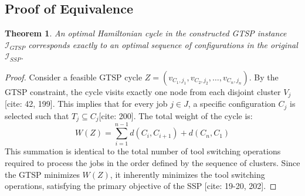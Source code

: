 \documentclass[12pt]{article}
\newtheorem{theorem}{Theorem}[section]
\begin{document}
\subsection{Proof of Equivalence}
\begin{theorem}
An optimal Hamiltonian cycle in the constructed GTSP instance $\mathcal{I}_{GTSP}$ corresponds exactly to an optimal sequence of configurations in the original $\mathcal{I}_{SSP}$.
\end{theorem}

\begin{proof}
Consider a feasible GTSP cycle $Z = (v_{C_1, j_1}, v_{C_2, j_2}, \dots, v_{C_n, j_n})$. By the GTSP constraint, the cycle visits exactly one node from each disjoint cluster $V_j$[cite: 42, 199]. This implies that for every job $j \in J$, a specific configuration $C_j$ is selected such that $T_j \subseteq C_j$[cite: 200]. 
The total weight of the cycle is:
\begin{equation}
    W(Z) = \sum_{i=1}^{n-1} d(C_i, C_{i+1}) + d(C_n, C_1)
\end{equation}
This summation is identical to the total number of tool switching operations required to process the jobs in the order defined by the sequence of clusters. Since the GTSP minimizes $W(Z)$, it inherently minimizes the tool switching operations, satisfying the primary objective of the SSP [cite: 19-20, 202].
\end{proof}
\end{document}
